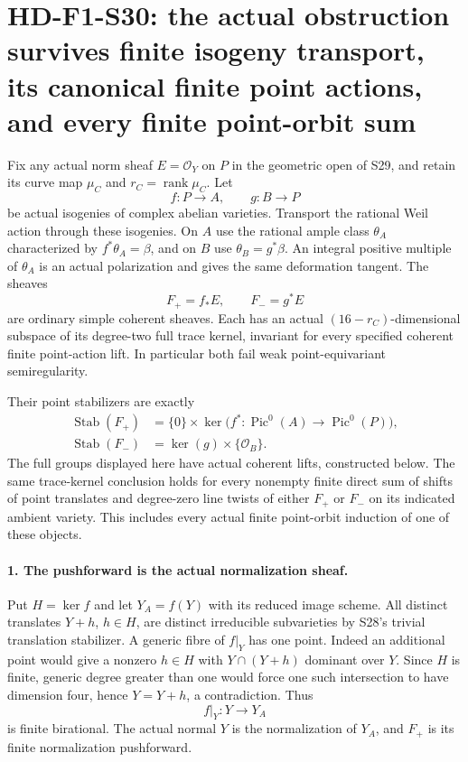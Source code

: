 \section[HD-F1-S30: isogeny transports and orbit sums retain the obstruction]{HD-F1-S30: the actual obstruction survives finite isogeny transport, its canonical finite point actions, and every finite point-orbit sum}
\label{sec:f1-norm-fourfold-isogeny-obstruction}

Fix any actual norm sheaf $E=\mathcal O_Y$ on $P$ in
the geometric open of S29, and retain its curve map $\mu_C$
and $r_C=\operatorname{rank}\mu_C$. Let
\[
                    f:P\longrightarrow A,\qquad
                    g:B\longrightarrow P
 \tag{F1S30.1}
\]
be actual isogenies of complex abelian varieties. Transport
the rational Weil action through these isogenies. On $A$
use the rational ample class $\theta_A$ characterized by
$f^*\theta_A=\beta$, and on $B$ use $\theta_B=g^*\beta$.
An integral positive multiple of $\theta_A$ is an actual
polarization and gives the same deformation tangent.
The sheaves
\[
                         F_+=f_*E,\qquad F_-=g^*E
 \tag{F1S30.2}
\]
are ordinary simple coherent sheaves. Each has an actual
$(16-r_C)$-dimensional subspace of its degree-two full
trace kernel, invariant for every specified coherent finite
point-action lift. In particular both fail weak
point-equivariant semiregularity.

Their point stabilizers are exactly
\[
 \begin{split}
 \operatorname{Stab}(F_+)
   &=\{0\}\times
       \ker\bigl(f^*:\operatorname{Pic}^0(A)
                              \to\operatorname{Pic}^0(P)\bigr),\\
 \operatorname{Stab}(F_-)&=\ker(g)\times\{\mathcal O_B\}.
 \end{split}
 \tag{F1S30.3}
\]
The full groups displayed here have actual coherent lifts,
constructed below. The same trace-kernel conclusion holds
for every nonempty finite direct sum of shifts of point
translates and degree-zero line twists of either $F_+$ or
$F_-$ on its indicated ambient variety. This includes every
actual finite point-orbit induction of one of these objects.

\paragraph{1. The pushforward is the actual normalization sheaf.}
Put $H=\ker f$ and let $Y_A=f(Y)$ with its reduced image
scheme. All distinct translates $Y+h$, $h\in H$, are
distinct irreducible subvarieties by S28's trivial
translation stabilizer. A generic fibre of $f|_Y$ has
one point. Indeed an additional point would give a
nonzero $h\in H$ with $Y\cap(Y+h)$ dominant over $Y$.
Since $H$ is finite, generic degree greater than one
would force one such intersection to have dimension four,
hence $Y=Y+h$, a contradiction. Thus
\[
                          f|_Y:Y\longrightarrow Y_A
 \tag{F1S30.4}
\]
is finite birational. The actual normal $Y$ is the
normalization of $Y_A$, and $F_+$ is its finite
normalization pushforward.

